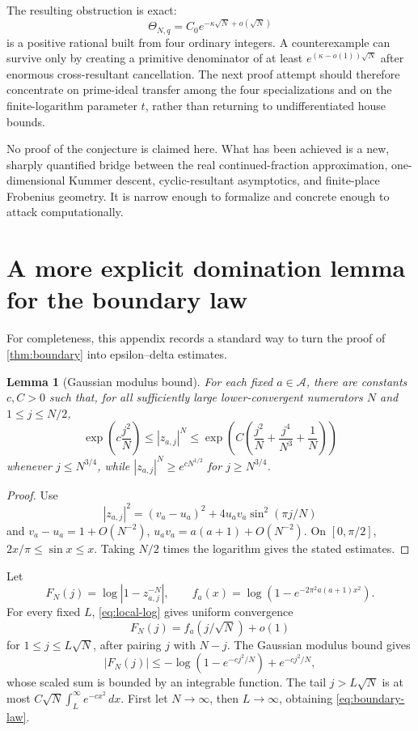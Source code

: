 \documentclass[11pt]{article}
\newtheorem{lemma}[theorem]{Lemma}
\theoremstyle{definition}
\theoremstyle{remark}
\begin{document}
The resulting obstruction is exact:
\[
\Theta_{N,q}=C_0e^{-\kappa\sqrt N+o(\sqrt N)}
\]
is a positive rational built from four ordinary integers.  A counterexample can survive only by creating a primitive denominator of at least
\(e^{(\kappa-o(1))\sqrt N}\) after enormous cross-resultant cancellation.  The next proof attempt should therefore concentrate on prime-ideal transfer among the four specializations and on the finite-logarithm parameter \(t\), rather than returning to undifferentiated house bounds.

No proof of the conjecture is claimed here.  What has been achieved is a new, sharply quantified bridge between the real continued-fraction approximation, one-dimensional Kummer descent, cyclic-resultant asymptotics, and finite-place Frobenius geometry.  It is narrow enough to formalize and concrete enough to attack computationally.

\appendix

\section{A more explicit domination lemma for the boundary law}

For completeness, this appendix records a standard way to turn the proof of \cref{thm:boundary} into epsilon--delta estimates.

\begin{lemma}[Gaussian modulus bound]
For each fixed \(a\in\mathcal A\), there are constants \(c,C>0\) such that, for all sufficiently large lower-convergent numerators \(N\) and \(1\le j\le N/2\),
\[
\exp\!\left(c\frac{j^2}{N}\right)
\le |z_{a,j}|^N
\le \exp\!\left(C\left(\frac{j^2}{N}+\frac{j^4}{N^3}+\frac1N\right)\right)
\]
whenever \(j\le N^{3/4}\), while \(|z_{a,j}|^N\ge e^{cN^{1/2}}\) for \(j\ge N^{3/4}\).
\end{lemma}

\begin{proof}
Use
\[
|z_{a,j}|^2=(v_a-u_a)^2+4u_av_a\sin^2(\pi j/N)
\]
and \(v_a-u_a=1+O(N^{-2})\), \(u_av_a=a(a+1)+O(N^{-2})\).  On \([0,\pi/2]\), \(2x/\pi\le\sin x\le x\).  Taking \(N/2\) times the logarithm gives the stated estimates.
\end{proof}

Let
\[
F_N(j)=\log|1-z_{a,j}^{-N}|,
\qquad f_a(x)=\log(1-e^{-2\pi^2a(a+1)x^2}).
\]
For every fixed \(L\), \eqref{eq:local-log} gives uniform convergence
\[
F_N(j)=f_a(j/\sqrt N)+o(1)
\]
for \(1\le j\le L\sqrt N\), after pairing \(j\) with \(N-j\).  The Gaussian modulus bound gives
\[
|F_N(j)|\le
-\log(1-e^{-c j^2/N})+e^{-c j^2/N},
\]
whose scaled sum is bounded by an integrable function.  The tail
\(j>L\sqrt N\) is at most
\(C\sqrt N\int_L^\infty e^{-cx^2}\,dx\).  First let \(N\to\infty\), then \(L\to\infty\), obtaining \eqref{eq:boundary-law}.
\end{document}
